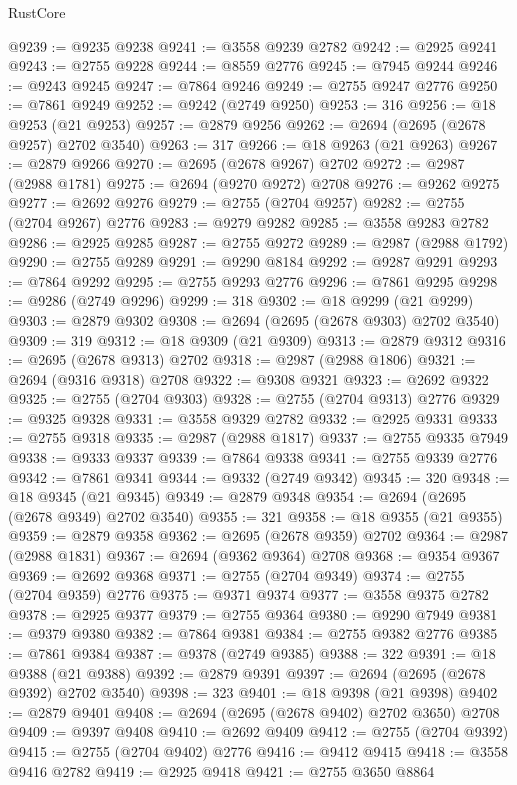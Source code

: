 \begin{lexlean}{RustCore}
\begin{coremodule}
@9239 := @9235 @9238
@9241 := @3558 @9239 @2782
@9242 := @2925 @9241
@9243 := @2755 @9228
@9244 := @8559 @2776
@9245 := @7945 @9244
@9246 := @9243 @9245
@9247 := @7864 @9246
@9249 := @2755 @9247 @2776
@9250 := @7861 @9249
@9252 := @9242 (@2749 @9250)
@9253 := 316
@9256 := @18 @9253 (@21 @9253)
@9257 := @2879 @9256
@9262 := @2694 (@2695 (@2678 @9257) @2702 @3540)
@9263 := 317
@9266 := @18 @9263 (@21 @9263)
@9267 := @2879 @9266
@9270 := @2695 (@2678 @9267) @2702
@9272 := @2987 (@2988 @1781)
@9275 := @2694 (@9270 @9272) @2708
@9276 := @9262 @9275
@9277 := @2692 @9276
@9279 := @2755 (@2704 @9257)
@9282 := @2755 (@2704 @9267) @2776
@9283 := @9279 @9282
@9285 := @3558 @9283 @2782
@9286 := @2925 @9285
@9287 := @2755 @9272
@9289 := @2987 (@2988 @1792)
@9290 := @2755 @9289
@9291 := @9290 @8184
@9292 := @9287 @9291
@9293 := @7864 @9292
@9295 := @2755 @9293 @2776
@9296 := @7861 @9295
@9298 := @9286 (@2749 @9296)
@9299 := 318
@9302 := @18 @9299 (@21 @9299)
@9303 := @2879 @9302
@9308 := @2694 (@2695 (@2678 @9303) @2702 @3540)
@9309 := 319
@9312 := @18 @9309 (@21 @9309)
@9313 := @2879 @9312
@9316 := @2695 (@2678 @9313) @2702
@9318 := @2987 (@2988 @1806)
@9321 := @2694 (@9316 @9318) @2708
@9322 := @9308 @9321
@9323 := @2692 @9322
@9325 := @2755 (@2704 @9303)
@9328 := @2755 (@2704 @9313) @2776
@9329 := @9325 @9328
@9331 := @3558 @9329 @2782
@9332 := @2925 @9331
@9333 := @2755 @9318
@9335 := @2987 (@2988 @1817)
@9337 := @2755 @9335 @7949
@9338 := @9333 @9337
@9339 := @7864 @9338
@9341 := @2755 @9339 @2776
@9342 := @7861 @9341
@9344 := @9332 (@2749 @9342)
@9345 := 320
@9348 := @18 @9345 (@21 @9345)
@9349 := @2879 @9348
@9354 := @2694 (@2695 (@2678 @9349) @2702 @3540)
@9355 := 321
@9358 := @18 @9355 (@21 @9355)
@9359 := @2879 @9358
@9362 := @2695 (@2678 @9359) @2702
@9364 := @2987 (@2988 @1831)
@9367 := @2694 (@9362 @9364) @2708
@9368 := @9354 @9367
@9369 := @2692 @9368
@9371 := @2755 (@2704 @9349)
@9374 := @2755 (@2704 @9359) @2776
@9375 := @9371 @9374
@9377 := @3558 @9375 @2782
@9378 := @2925 @9377
@9379 := @2755 @9364
@9380 := @9290 @7949
@9381 := @9379 @9380
@9382 := @7864 @9381
@9384 := @2755 @9382 @2776
@9385 := @7861 @9384
@9387 := @9378 (@2749 @9385)
@9388 := 322
@9391 := @18 @9388 (@21 @9388)
@9392 := @2879 @9391
@9397 := @2694 (@2695 (@2678 @9392) @2702 @3540)
@9398 := 323
@9401 := @18 @9398 (@21 @9398)
@9402 := @2879 @9401
@9408 := @2694 (@2695 (@2678 @9402) @2702 @3650) @2708
@9409 := @9397 @9408
@9410 := @2692 @9409
@9412 := @2755 (@2704 @9392)
@9415 := @2755 (@2704 @9402) @2776
@9416 := @9412 @9415
@9418 := @3558 @9416 @2782
@9419 := @2925 @9418
@9421 := @2755 @3650 @8864

\end{coremodule}
\end{lexlean}
